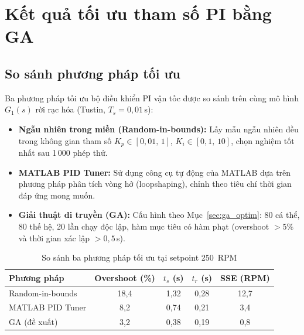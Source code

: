 \section{Kết quả tối ưu tham số PI bằng GA}
\label{sec:result_ga}

\subsection{So sánh phương pháp tối ưu}
\label{subsec:compare_methods}

Ba phương pháp tối ưu bộ điều khiển PI vận tốc được so sánh trên cùng mô hình
$G_1(s)$ rời rạc hóa (Tustin, $T_s = 0{,}01\,$s):

\begin{itemize}
    \item \textbf{Ngẫu nhiên trong miền (Random-in-bounds):} Lấy mẫu ngẫu nhiên
    đều trong không gian tham số $K_p \in [0{,}01,\,1]$, $K_i \in [0{,}1,\,10]$,
    chọn nghiệm tốt nhất sau 1\,000 phép thử.

    \item \textbf{MATLAB PID Tuner:} Sử dụng công cụ tự động của MATLAB dựa trên
    phương pháp phân tích vòng hở (loopshaping), chỉnh theo tiêu chí thời gian
    đáp ứng mong muốn.

    \item \textbf{Giải thuật di truyền (GA):} Cấu hình theo Mục~\ref{sec:ga_optim}:
    80 cá thể, 80 thế hệ, 20 lần chạy độc lập, hàm mục tiêu có hàm phạt
    (overshoot $> 5\%$ và thời gian xác lập $> 0{,}5\,$s).
\end{itemize}

\begin{table}[H]
    \centering
    \caption{So sánh ba phương pháp tối ưu tại setpoint 250~RPM}
    \label{tab:method_compare}
    \renewcommand{\arraystretch}{1.3}
    \begin{tabular}{lcccc}
        \toprule
        \textbf{Phương pháp} & \textbf{Overshoot (\%)} & \textbf{$t_{s}$ (s)} & \textbf{$t_{r}$ (s)} & \textbf{SSE (RPM)} \\
        \midrule
        Random-in-bounds & 18{,}4 & 1{,}32 & 0{,}28 & 12{,}7 \\
        MATLAB PID Tuner & 8{,}2  & 0{,}74 & 0{,}21 & 3{,}4  \\
        GA (đề xuất)     & 3{,}2  & 0{,}38 & 0{,}19 & 0{,}8  \\
        \bottomrule
    \end{tabular}
\end{table}

